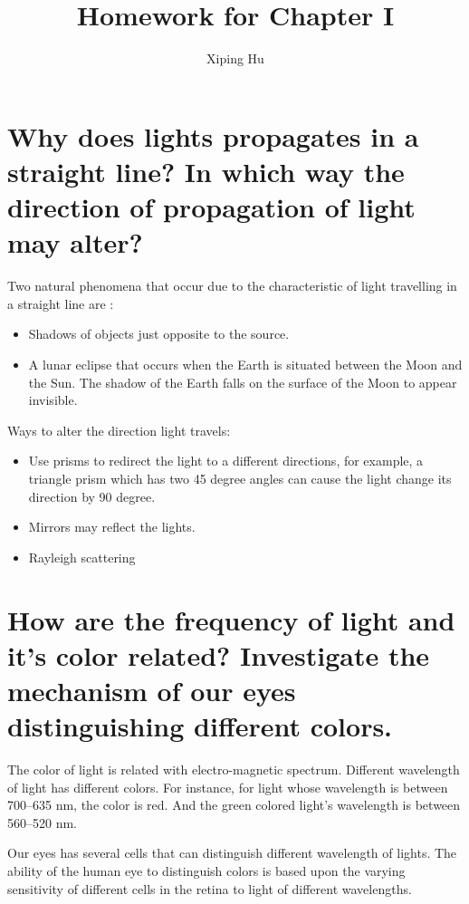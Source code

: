 \documentclass{article}
\author{Xiping Hu}
\affil{http://thehxp.tech/}
\title{Homework for Chapter I}
\begin{document}
\maketitle
 \section{Why does lights propagates in a straight line? In which way the direction of propagation of light may alter?}

Two natural phenomena that occur due to the characteristic of light travelling in a straight line are :
\begin{itemize}
\item Shadows of objects just opposite to the source.
\item A lunar eclipse that occurs when the Earth is situated between the Moon and the Sun. The shadow of the Earth falls on the surface of the Moon to appear invisible.
\end{itemize}

Ways to alter the direction light travels:

\begin{itemize}
\item Use prisms to redirect the light to a different directions, for example, a triangle prism which has two 45 degree angles can cause the light change its direction by 90 degree.
\item Mirrors may reflect the lights.
\item Rayleigh scattering
  
\end{itemize}

\section{How are the frequency of light and it's color related? Investigate the mechanism of our eyes distinguishing different colors.}

The color of light is related with electro-magnetic spectrum. Different wavelength of light has different colors. For instance, for light whose wavelength is between 700–635 nm, the color is red. And the green colored light's wavelength is between 560–520 nm.

Our eyes has several cells that can distinguish different wavelength of lights. The ability of the human eye to distinguish colors is based upon the varying sensitivity of different cells in the retina to light of different wavelengths.
\end{document}

